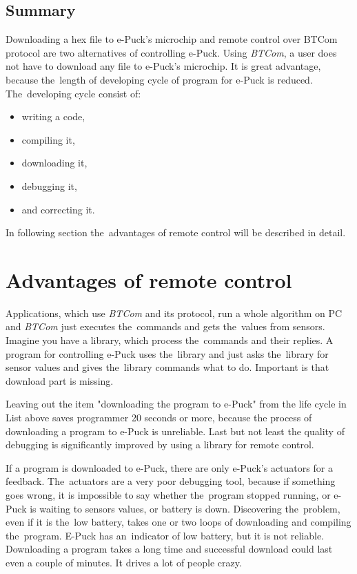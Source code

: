   \subsection*{Summary} %
  Downloading a hex file to e-Puck's microchip and remote control over BTCom protocol are two alternatives
  of controlling e-Puck.
  Using {\it BTCom}, a user does not have to download any file to e-Puck's microchip.
  It is great advantage, because the~length of developing cycle of program for e-Puck is reduced.
  The~developing cycle consist of:
  \begin{itemize}
    \item writing a code,
    \item compiling it,
    \item downloading it,
    \item debugging it,  
    \item and correcting it.
  \end{itemize}
  In following section the~advantages of remote control will be described in detail.

\section{Advantages of remote control} \label{sec:remote}
  Applications, which use {\it BTCom} and its protocol, run a whole algorithm on PC and {\it BTCom} just 
  executes the~commands and gets the~values from sensors. Imagine you have a library, which process the~commands
  and their replies. A program for  controlling e-Puck uses the~library and just asks the~library for sensor values and
  gives the~library commands what to do. Important is that download part is missing.
   
  Leaving out the item "downloading the program to e-Puck" from the life cycle in List above saves programmer 
  20 seconds or more, because the process of downloading a program to e-Puck is unreliable.
  Last but not least the quality of debugging is significantly improved by using a library for remote control.

  If a program is downloaded to e-Puck, there are only e-Puck's actuators for a feedback.
  The~actuators are a very poor debugging tool, because if something goes wrong, 
  it is impossible to say whether the~program stopped running,
  or e-Puck is waiting to sensors values, or battery is down. 
  Discovering the~problem, even if it is the~low battery, takes one or two loops of downloading and compiling the~program.
  E-Puck has an~indicator of low battery, but it is not reliable.
  Downloading a program takes a long time and successful download could last even a couple of minutes. 
  It drives a lot of people crazy.
   
